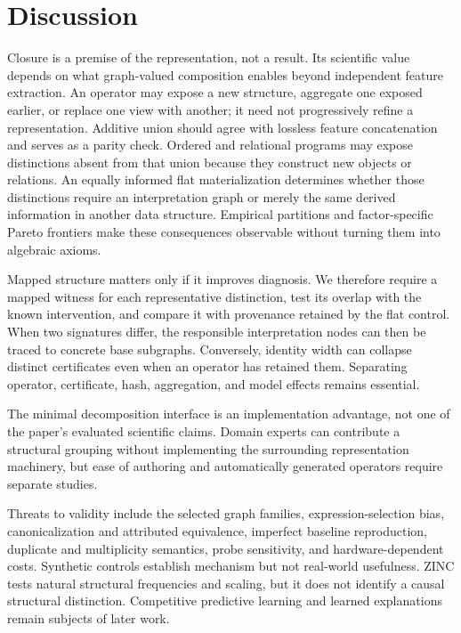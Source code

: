 \section{Discussion}
\label{sec:discussion}

Closure is a premise of the representation, not a result. Its scientific value
depends on what graph-valued composition enables beyond independent feature
extraction. An operator may expose a new structure, aggregate one exposed
earlier, or replace one view with another; it need not progressively refine a
representation. Additive union should agree with lossless feature concatenation
and serves as a parity check. Ordered and relational programs may expose
distinctions absent from that union because they construct new objects or
relations. An equally informed flat materialization determines whether those
distinctions require an interpretation graph or merely the same derived
information in another data structure. Empirical partitions and factor-specific
Pareto frontiers make these consequences observable without turning them into
algebraic axioms.

Mapped structure matters only if it improves diagnosis. We therefore require a
mapped witness for each representative distinction, test its overlap with the
known intervention, and compare it with provenance retained by the flat
control. When two signatures differ, the responsible
interpretation nodes can then be traced to concrete base subgraphs. Conversely,
identity width can collapse distinct certificates even when an operator has
retained them. Separating operator, certificate, hash, aggregation, and model
effects remains essential.

The minimal decomposition interface is an implementation advantage, not one of
the paper's evaluated scientific claims. Domain experts can contribute a
structural grouping without implementing the surrounding representation
machinery, but ease of authoring and automatically generated operators require
separate studies.

Threats to validity include the selected graph families, expression-selection
bias, canonicalization and attributed equivalence, imperfect baseline
reproduction, duplicate and multiplicity semantics, probe sensitivity, and
hardware-dependent costs. Synthetic controls establish mechanism but not
real-world usefulness. ZINC tests natural structural frequencies and scaling,
but it does not identify a causal structural distinction. Competitive
predictive learning and learned explanations remain subjects of later work.
